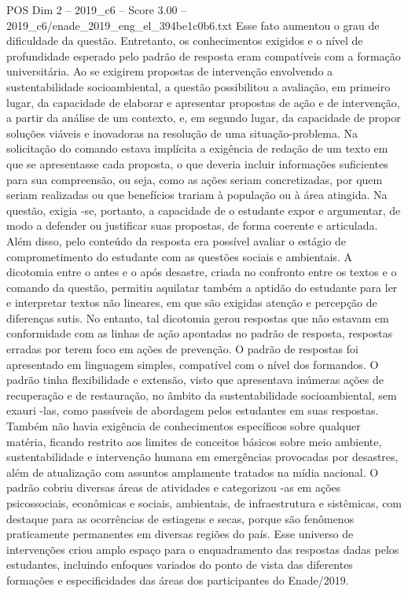 \begin{textsample}{POS Dim 2 – 2019\_c6 – Score 3.00 – 2019\_c6/enade\_2019\_eng\_el\_394be1c0b6.txt}
Esse fato aumentou o grau de dificuldade da questão.
Entretanto, os conhecimentos exigidos e o nível de profundidade esperado pelo padrão de resposta eram compatíveis com a formação universitária.
Ao se exigirem propostas de intervenção envolvendo a sustentabilidade socioambiental, a questão possibilitou a avaliação, em primeiro lugar, da capacidade de elaborar e apresentar propostas de ação e de intervenção, a partir da análise de um contexto, e, em segundo lugar, da capacidade de propor soluções viáveis e inovadoras na resolução de uma situação-problema.
Na solicitação do comando estava implícita a exigência de redação de um texto em que se apresentasse cada proposta, o que deveria incluir informações suficientes para sua compreensão, ou seja, como as ações seriam concretizadas, por quem seriam realizadas ou que benefícios trariam à população ou à área atingida.
Na questão, exigia -se, portanto, a capacidade de o estudante expor e argumentar, de modo a defender ou justificar suas propostas, de forma coerente e articulada.
Além disso, pelo conteúdo da resposta era possível avaliar o estágio de comprometimento do estudante com as questões sociais e ambientais.
A dicotomia entre o antes e o após desastre, criada no confronto entre os textos e o comando da questão, permitiu aquilatar também a aptidão do estudante para ler e interpretar textos não lineares, em que são exigidas atenção e percepção de diferenças sutis.
No entanto, tal dicotomia gerou respostas que não estavam em conformidade com as linhas de ação apontadas no padrão de resposta, respostas erradas por terem foco em ações de prevenção.
O padrão de respostas foi apresentado em linguagem simples, compatível com o nível dos formandos.
O padrão tinha flexibilidade e extensão, visto que apresentava inúmeras ações de recuperação e de restauração, no âmbito da sustentabilidade socioambiental, sem exauri -las, como passíveis de abordagem pelos estudantes em suas respostas.
Também não havia exigência de conhecimentos específicos sobre qualquer matéria, ficando restrito aos limites de conceitos básicos sobre meio ambiente, sustentabilidade e intervenção humana em emergências provocadas por desastres, além de atualização com assuntos amplamente tratados na mídia nacional.
O padrão cobriu diversas áreas de atividades e categorizou -as em ações psicossociais, econômicas e sociais, ambientais, de infraestrutura e sistêmicas, com destaque para as ocorrências de estiagens e secas, porque são fenômenos praticamente permanentes em diversas regiões do país.
Esse universo de intervenções criou amplo espaço para o enquadramento das respostas dadas pelos estudantes, incluindo enfoques variados do ponto de vista das diferentes formações e especificidades das áreas dos participantes do Enade/2019.

\end{textsample}
